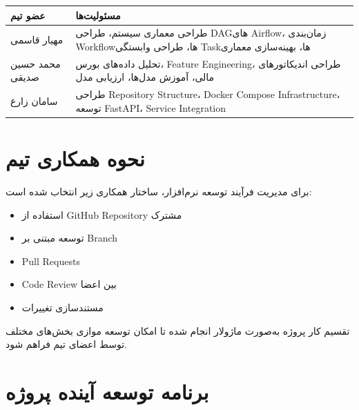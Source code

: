 \documentclass[12pt,a4paper]{article}
\begin{document}
\begin{table}[h]

\centering

\begin{tabular}{|p{4cm}|p{8cm}|}

\hline

\textbf{عضو تیم} & \textbf{مسئولیت‌ها} \\

\hline

مهیار قاسمی &
طراحی معماری سیستم، طراحی DAGهای Airflow، زمان‌بندی Workflowها، طراحی وابستگی Taskها، بهینه‌سازی معماری
\\

\hline

محمد حسین صدیقی &
تحلیل داده‌های بورس، Feature Engineering، طراحی اندیکاتورهای مالی، آموزش مدل‌ها، ارزیابی مدل
\\

\hline

سامان زارع &
طراحی Repository Structure، Docker Compose Infrastructure، توسعه FastAPI، Service Integration
\\

\hline

\end{tabular}

\end{table}


\section{نحوه همکاری تیم}

برای مدیریت فرآیند توسعه نرم‌افزار، ساختار همکاری زیر انتخاب شده است:

\begin{itemize}
\item استفاده از GitHub Repository مشترک
\item توسعه مبتنی بر Branch
\item Pull Requests
\item Code Review بین اعضا
\item مستندسازی تغییرات
\end{itemize}

تقسیم کار پروژه به‌صورت ماژولار انجام شده تا امکان توسعه موازی بخش‌های مختلف توسط اعضای تیم فراهم شود.


\section{برنامه توسعه آینده پروژه}
\end{document}
